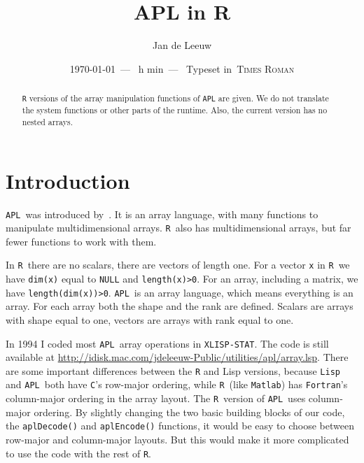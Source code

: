 \documentclass[11pt]{amsart}
\def\myfont{\textsc{Computer Modern}}
\def\myfont{\textsc{Lucida Bright}}
\def\myfont{\textsc{Palatino}}
\def\myfont{\textsc{Times Roman}}
\theoremstyle{plain}
\theoremstyle{definition}
\theoremstyle{remark}
\newcounter{hours}
\newcounter{minutes}
\newcommand\printtime{\setcounter{hours}{\time/60}%
	\setcounter{minutes}{\time-\value{hours}*60}%
	\thehours h \theminutes min}
\newcommand{\tR}{\texttt{R}}
\newcommand{\tA}{\texttt{APL}}
\newcommand{\tT}[1]{\texttt{#1}}
\newcommand{\tRc}[1]{\lstinline{#1}}
\newcommand{\tAc}[1]{{\apl{#1}}}
\begin{document}
\title{APL in R}
\author{Jan de Leeuw}
\address{Department of Statistics\\ University of California\\ Los Angeles, CA 90095-1554}
\ifpdf
{}
\else
{}
\fi
\date{\today\ ---\ \printtime\ --- \ Typeset in\ \myfont}
\begin{abstract}
\texttt{R} versions of the array manipulation functions of \texttt{APL}
are given. We do not translate the system functions or other parts of the
runtime. Also, the current version has no nested arrays.
\end{abstract}
\maketitle
\tableofcontents
\newpage
\section{Introduction}
\tA\ was introduced by~\citet{iverson_62}. It is an array language, with many functions to manipulate multidimensional arrays. \tR\ also has multidimensional arrays, but far fewer functions to work with them.

In \tR\ there are no scalars, there are vectors of length one. For a vector \tT{x}
in \tR\ we have \tRc{dim(x)} equal to \tT{NULL} and \tRc{length(x)>0}. For an array, including a matrix,
we have \tRc{length(dim(x))>0}. \tA\ is an array
language, which means everything is an array. For each array both the shape \tAc{\qrho A} and the rank
\tAc{\qrho\qrho A} are defined. Scalars are arrays with shape equal to one, vectors are arrays with
rank equal to one.

In 1994 I coded most \tA\ array operations in \tT{XLISP-STAT}. The code is still available at \href{http://idisk.mac.com/jdeleeuw-Public/utilities/apl/array.lsp}{http://idisk.mac.com/jdeleeuw-Public/utilities/apl/array.lsp}. There are some important differences
between the \texttt{R} and Lisp versions, because \texttt{Lisp} and \tA\ both have
\texttt{C}'s row-major ordering, while \tR\ (like \texttt{Matlab}) has \texttt{Fortran}'s
column-major ordering in the array layout. The \tR\ version of
\tA\ uses column-major ordering.
By slightly changing the two basic building blocks of our code, the \tRc{aplDecode()} and
\tRc{aplEncode()} functions, it would be easy to choose between row-major
and column-major layouts. But this would make it more complicated to use the code
with the rest of \tR.
\end{document}
